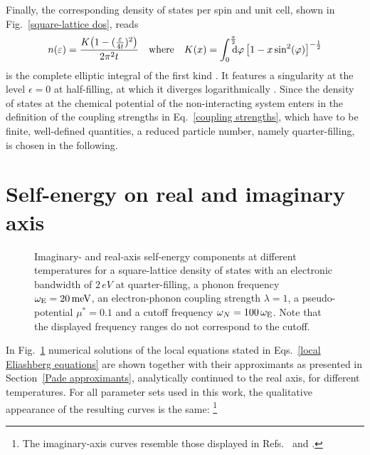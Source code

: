 Finally, the corresponding density of states per spin and unit cell, shown in
Fig.~\ref{square-lattice dos}, reads
%
\begin{equation*}
    n(\epsilon) = \frac{K \big(1 - (\tfrac \epsilon {4 t})^2 \big)}{2 \pi^2 t}
    \quad \text{where} \quad
    K(x) = \int \from 0 \till{\frac \pi 2} \D \varphi \,
    \big[ 1 - x \sin^2(\varphi) \big]^{-\frac 1 2}
\end{equation*}
%
is the complete elliptic integral of the first kind \cite[Eq.~4.146 and
4.147]{Czycholl08}. It features a  singularity at the
 level $\epsilon = 0$ at half-filling, at which it diverges
logarithmically \cite[Eq.~7]{Szczesniak06a}. Since the density of states at the
chemical potential of the non-interacting system enters in the definition of the
coupling strengths in Eq.~\ref{coupling strengths}, which have to be finite,
well-defined quantities, a reduced particle number, namely quarter-filling, is
chosen in the following.

\section{Self-energy on real and imaginary axis}

\begin{figure}
    \small
    
    
    
    
    
    
    \caption[Self-energy at different temperatures]{
        Imaginary- and real-axis self-energy components at different
        temperatures for a square-lattice density of states with an electronic
        bandwidth of $2 \, \unit{eV}$ at quarter-filling, a phonon frequency
        $\omega \sb{\text{E}} = 20 \, \mathrm{meV}$, an electron-phonon coupling strength
        $\lambda = 1$, a  pseudo-potential $\mu^* = 0.1$ and a
        cutoff frequency $\omega_N = 100 \, \omega \sb{\text{E}}$. Note that the
        displayed frequency ranges do not correspond to the cutoff.}
    \label{imaginary- and real-axis self-energy components}
\end{figure}
%
In Fig.~\ref{imaginary- and real-axis self-energy components} numerical
solutions of the local  equations stated in Eqs.~\ref{local
Eliashberg equations} are shown together with their  approximants as
presented in Section~\ref{Pade approximants}, analytically continued to the real
axis, for different temperatures. For all parameter sets used in this work, the
qualitative appearance of the resulting curves is the same:%
%
\footnote{The imaginary-axis curves resemble those displayed in
Refs.~ and .}

